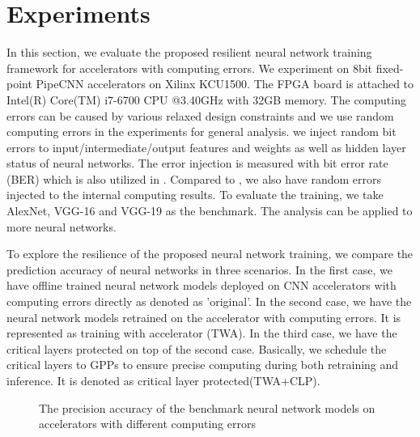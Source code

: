 \section{Experiments} \label{sec:casestudy}
In this section, we evaluate the proposed resilient neural network training 
framework for accelerators with computing errors. 
We experiment on 8bit fixed-point PipeCNN \cite{pipecnn_2} accelerators on Xilinx KCU1500.
The FPGA board is attached to Intel(R) Core(TM) i7-6700 CPU @3.40GHz with 32GB memory.
The computing errors can be caused by various relaxed design constraints and we use random computing 
errors in the experiments for general analysis.
we inject random bit errors to input/intermediate/output features and weights as well as 
hidden layer status of neural networks. The error injection is measured with 
bit error rate (BER) which is also utilized in \cite{B2018ARES}. Compared to \cite{B2018ARES},
we also have random errors injected to the internal computing results. 
To evaluate the training, we take AlexNet, VGG-16 and VGG-19 as the benchmark. 
The analysis can be applied to more neural networks.

To explore the resilience of the proposed neural network training, we
compare the prediction accuracy of neural networks in three scenarios.
In the first case, we have offline trained neural network models deployed on 
CNN accelerators with computing errors directly as denoted as 'original'.
In the second case, we have the neural network models retrained on the 
accelerator with computing errors. It is represented as training with 
accelerator (TWA). In the third case, we have the critical layers 
protected on top of the second case. Basically, we schedule the critical layers to 
GPPs to ensure precise computing during both retraining and inference.
It is denoted as critical layer protected(TWA+CLP).

\begin{figure}[t]
        \center
        \qquad
        \qquad
        \caption{The precision accuracy of the benchmark neural network models on accelerators with different computing errors}
        \label{fig:softerror-accuracy}
\end{figure}

